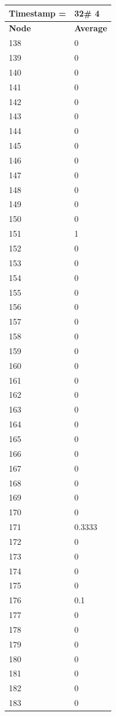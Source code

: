 \begin{tabular}{|l||l|}
\hline
\textbf{Timestamp =} & \textbf{32}\# 4\\\hline
	\textbf{Node} & \textbf{Average} \\ \hline
\hline
	138 & 0 \\ \hline
	139 & 0 \\ \hline
	140 & 0 \\ \hline
	141 & 0 \\ \hline
	142 & 0 \\ \hline
	143 & 0 \\ \hline
	144 & 0 \\ \hline
	145 & 0 \\ \hline
	146 & 0 \\ \hline
	147 & 0 \\ \hline
	148 & 0 \\ \hline
	149 & 0 \\ \hline
	150 & 0 \\ \hline
	151 & 1 \\ \hline
	152 & 0 \\ \hline
	153 & 0 \\ \hline
	154 & 0 \\ \hline
	155 & 0 \\ \hline
	156 & 0 \\ \hline
	157 & 0 \\ \hline
	158 & 0 \\ \hline
	159 & 0 \\ \hline
	160 & 0 \\ \hline
	161 & 0 \\ \hline
	162 & 0 \\ \hline
	163 & 0 \\ \hline
	164 & 0 \\ \hline
	165 & 0 \\ \hline
	166 & 0 \\ \hline
	167 & 0 \\ \hline
	168 & 0 \\ \hline
	169 & 0 \\ \hline
	170 & 0 \\ \hline
	171 & 0.3333 \\ \hline
	172 & 0 \\ \hline
	173 & 0 \\ \hline
	174 & 0 \\ \hline
	175 & 0 \\ \hline
	176 & 0.1 \\ \hline
	177 & 0 \\ \hline
	178 & 0 \\ \hline
	179 & 0 \\ \hline
	180 & 0 \\ \hline
	181 & 0 \\ \hline
	182 & 0 \\ \hline
	183 & 0 \\ \hline
\end{tabular}
